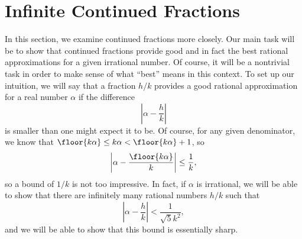 \documentclass[../notes.tex]{subfiles}
\begin{document}
\section{Infinite Continued Fractions}
In this section, we examine continued fractions more closely. Our main task will be to show that continued fractions provide good and in fact the best rational approximations for a given irrational number. Of course, it will be a nontrivial task in order to make sense of what ``best'' means in this context. To set up our intuition, we will say that a fraction $h/k$ provides a good rational approximation for a real number $\alpha$ if the difference
\[\left|\alpha-\frac hk\right|\]
is smaller than one might expect it to be. Of course, for any given denominator, we know that $\floor{k\alpha}\le k\alpha<\floor{k\alpha}+1$, so
\[\left|\alpha-\frac{\floor{k\alpha}}k\right|\le\frac1k,\]
so a bound of $1/k$ is not too impressive. In fact, if $\alpha$ is irrational, we will be able to show that there are infinitely many rational numbers $h/k$ such that
\[\left|\alpha-\frac hk\right|<\frac1{\sqrt 5k^2},\]
and we will be able to show that this bound is essentially sharp.
\end{document}
